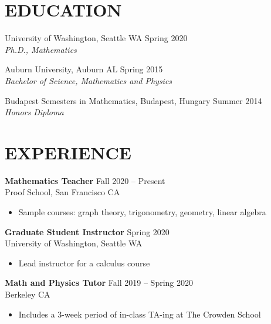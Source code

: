 \documentclass{res}
\begin{document}



\address{\bf
CONTACT \\
grahamwalkergordon@gmail.com \(\mid\)
\url{https://grahamwgordon.github.io/}
}
\begin{resume}


\section{EDUCATION}
  \vspace{2mm}
  University of Washington, Seattle WA \hfill Spring 2020\\
  \textit{Ph.D., Mathematics}
  
  Auburn University, Auburn AL \hfill Spring 2015 \\
  \textit{Bachelor of Science, Mathematics and Physics}

  Budapest Semesters in Mathematics, Budapest, Hungary \hfill Summer 2014 \\
  \textit{Honors Diploma}

\section{EXPERIENCE}
  \vspace{2mm}

{\bf Mathematics Teacher} \hfill Fall 2020 -- Present \\ Proof School, San Francisco CA

\begin{itemize}
	\item Sample courses: graph theory, trigonometry, geometry, linear algebra
\end{itemize}

{\bf Graduate Student Instructor} \hfill Spring 2020 \\ University of Washington, Seattle WA

\begin{itemize}
\item Lead instructor for a calculus course
\end{itemize}


{\bf Math and Physics Tutor} \hfill Fall 2019 -- Spring 2020 \\ Berkeley CA
\begin{itemize}
\item Includes a 3-week period of in-class TA-ing at The Crowden School
\end{itemize}



\end{resume}
\end{document}
